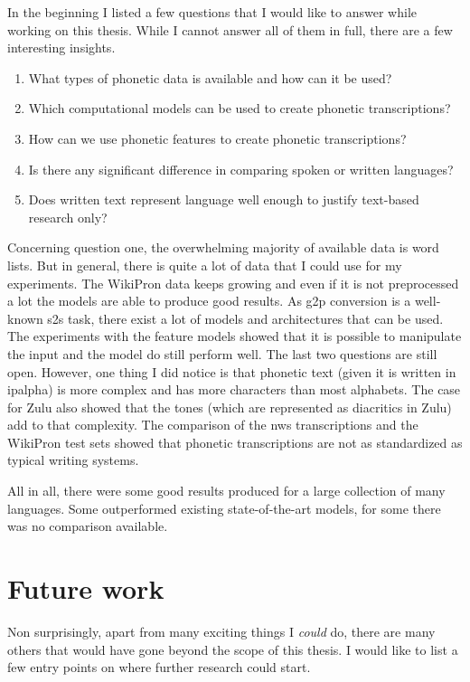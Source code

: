 \label{chap:6_conclusion}
In the beginning I listed a few questions that I would like to answer while working on this thesis. While I cannot answer all of them in full, there are a few interesting insights.

\begin{enumerate}
\item What types of phonetic data is available and how can it be used?
\item Which computational models can be used to create phonetic transcriptions?
\item How can we use phonetic features to create phonetic transcriptions?
\item Is there any significant difference in comparing spoken or written languages?
\item Does written text represent language well enough to justify text-based research only?
\end{enumerate}

Concerning question one, the overwhelming majority of available data is word lists. But in general, there is quite a lot of data that I could use for my experiments. The WikiPron data keeps growing and even if it is not preprocessed a lot the models are able to produce good results. As \ac{g2p} conversion is a well-known \ac{s2s} task, there exist a lot of models and architectures that can be used. The experiments with the feature models showed that it is possible to manipulate the input and the model do still perform well. The last two questions are still open. However, one thing I did notice is that phonetic text (given it is written in \ac{ipalpha}) is more complex and has more characters than most alphabets. The case for Zulu also showed that the tones (which are represented as diacritics in Zulu) add to that complexity. The comparison of the \ac{nws} transcriptions and the WikiPron test sets showed that phonetic transcriptions are not as standardized as typical writing systems. 

All in all, there were some good results produced for a large collection of many languages. Some outperformed existing state-of-the-art models, for some there was no comparison available. 

\section{Future work}
Non surprisingly, apart from many exciting things I \textit{could} do, there are many others that would have gone beyond the scope of this thesis. I would like to list a few entry points on where further research could start. 

